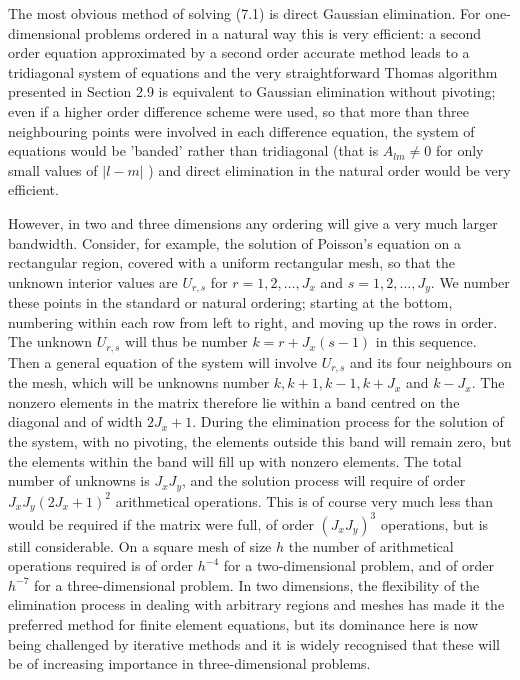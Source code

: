 \documentclass[10pt]{article}
\begin{document}
The most obvious method of solving (7.1) is direct Gaussian elimination. For one-dimensional problems ordered in a natural way this is very efficient: a second order equation approximated by a second order accurate method leads to a tridiagonal system of equations and the very straightforward Thomas algorithm presented in Section 2.9 is equivalent to Gaussian elimination without pivoting; even if a higher order difference scheme were used, so that more than three neighbouring points were involved in each difference equation, the system of equations would be 'banded' rather than tridiagonal (that is \(A_{l m} \neq 0\) for only small values of \(|l-m|\) ) and direct elimination in the natural order would be very efficient.

However, in two and three dimensions any ordering will give a very much larger bandwidth. Consider, for example, the solution of Poisson's equation on a rectangular region, covered with a uniform rectangular mesh, so that the unknown interior values are \(U_{r, s}\) for \(r=1,2, \ldots, J_{x}\) and \(s=1,2, \ldots, J_{y}\). We number these points in the standard or natural ordering; starting at the bottom, numbering within each row from left to right, and moving up the rows in order. The unknown \(U_{r, s}\) will thus be number \(k=r+J_{x}(s-1)\) in this sequence. Then a general equation of the system will involve \(U_{r, s}\) and its four neighbours on the mesh, which will be unknowns number \(k, k+1, k-1, k+J_{x}\) and \(k-J_{x}\). The nonzero elements in the matrix therefore lie within a band centred on the diagonal and of width \(2 J_{x}+1\). During the elimination process for the solution of the system, with no pivoting, the elements outside this band will remain zero, but the elements within the band will fill up with nonzero elements. The total number of unknowns is \(J_{x} J_{y}\), and the solution process will require of order \(J_{x} J_{y}\left(2 J_{x}+1\right)^{2}\) arithmetical operations. This is of course very much less than would be required if the matrix were full, of order \(\left(J_{x} J_{y}\right)^{3}\) operations, but is still considerable. On a square mesh of size \(h\) the number of arithmetical operations required is of order \(h^{-4}\) for a two-dimensional problem, and of order \(h^{-7}\) for a three-dimensional problem. In two dimensions, the flexibility of the elimination process in dealing with arbitrary regions and meshes has made it the preferred method for finite element equations, but its dominance here is now being challenged by iterative methods and it is widely recognised that these will be of increasing importance in three-dimensional problems.
\end{document}
